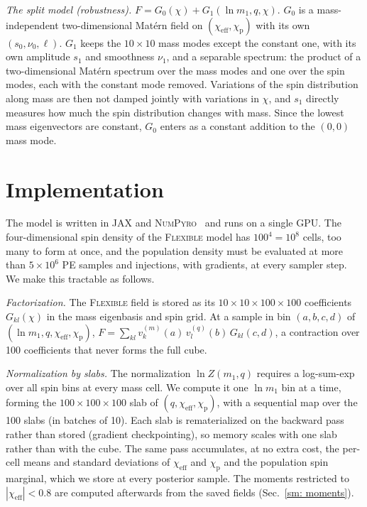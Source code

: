 \documentclass[%
 onecolumn,
 amsmath,amssymb,
 aps,
 prl,
 nofootinbib,nobibnotes,
]{revtex4-2}
\newcommand{\chieff}{\ensuremath{\chi_{\mathrm{eff}}}}
\newcommand{\chip}{\ensuremath{\chi_{\mathrm{p}}}}
\newcommand{\flexiblespins}{\textsc{Flexible}\xspace}
\begin{document}
\textit{The split model (robustness).} $F = G_0(\chi) + G_1(\ln m_1, q, \chi)$. $G_0$ is a mass-independent two-dimensional Mat\'ern field on $(\chieff, \chip)$ with its own $(s_0, \nu_0, \ell)$. $G_1$ keeps the $10 \times 10$ mass modes except the constant one, with its own amplitude $s_1$ and smoothness $\nu_1$, and a separable spectrum: the product of a two-dimensional Mat\'ern spectrum over the mass modes and one over the spin modes, each with the constant mode removed. Variations of the spin distribution along mass are then not damped jointly with variations in $\chi$, and $s_1$ directly measures how much the spin distribution changes with mass. Since the lowest mass eigenvectors are constant, $G_0$ enters as a constant addition to the $(0, 0)$ mass mode.

\section{Implementation}
\label{sm: implementation}

The model is written in \textsc{JAX} and \textsc{NumPyro}~\cite{Phan:2019numpyro} and runs on a single GPU. The four-dimensional spin density of the \flexiblespins model has $100^4 = 10^8$ cells, too many to form at once, and the population density must be evaluated at more than $5 \times 10^6$ \ac{PE} samples and injections, with gradients, at every sampler step. We make this tractable as follows.

\textit{Factorization.} The \flexiblespins field is stored as its $10 \times 10 \times 100 \times 100$ coefficients $G_{kl}(\chi)$ in the mass eigenbasis and spin grid. At a sample in bin $(a, b, c, d)$ of $(\ln m_1, q, \chieff, \chip)$, $F = \sum_{kl} v^{(m)}_k(a)\, v^{(q)}_l(b)\, G_{kl}(c, d)$, a contraction over 100 coefficients that never forms the full cube.

\textit{Normalization by slabs.} The normalization $\ln Z(m_1, q)$ requires a log-sum-exp over all spin bins at every mass cell. We compute it one $\ln m_1$ bin at a time, forming the $100 \times 100 \times 100$ slab of $(q, \chieff, \chip)$, with a sequential map over the 100 slabs (in batches of 10). Each slab is rematerialized on the backward pass rather than stored (gradient checkpointing), so memory scales with one slab rather than with the cube. The same pass accumulates, at no extra cost, the per-cell means and standard deviations of $\chieff$ and $\chip$ and the population spin marginal, which we store at every posterior sample. The moments restricted to $|\chieff| < 0.8$ are computed afterwards from the saved fields (Sec.~\ref{sm: moments}).
\end{document}

